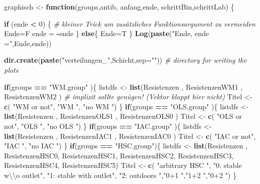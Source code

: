 \documentclass[
]{article}
\newenvironment{Shaded}{\begin{snugshade}}{\end{snugshade}}
\newcommand{\CharTok}[1]{\textcolor[rgb]{0.31,0.60,0.02}{#1}}
\newcommand{\CommentTok}[1]{\textcolor[rgb]{0.56,0.35,0.01}{\textit{#1}}}
\newcommand{\ControlFlowTok}[1]{\textcolor[rgb]{0.13,0.29,0.53}{\textbf{#1}}}
\newcommand{\DataTypeTok}[1]{\textcolor[rgb]{0.13,0.29,0.53}{#1}}
\newcommand{\DecValTok}[1]{\textcolor[rgb]{0.00,0.00,0.81}{#1}}
\newcommand{\KeywordTok}[1]{\textcolor[rgb]{0.13,0.29,0.53}{\textbf{#1}}}
\newcommand{\NormalTok}[1]{#1}
\newcommand{\OperatorTok}[1]{\textcolor[rgb]{0.81,0.36,0.00}{\textbf{#1}}}
\newcommand{\StringTok}[1]{\textcolor[rgb]{0.31,0.60,0.02}{#1}}
\begin{document}
\begin{Shaded}
\begin{Highlighting}[]
\NormalTok{graphisch <-}\StringTok{ }\ControlFlowTok{function}\NormalTok{(groups,antib, anfang,ende, schrittBin,schrittLab) \{    }

  \ControlFlowTok{if}\NormalTok{ (ende }\OperatorTok{<}\StringTok{ }\DecValTok{0}\NormalTok{) \{            }\CommentTok{# kleiner Trick um zusätzliches Funktionsargument zu vermeiden}
\NormalTok{    Ende=F}
\NormalTok{    ende =}\StringTok{ }\OperatorTok{-}\NormalTok{ende}
\NormalTok{  \} }\ControlFlowTok{else}\NormalTok{\{}
\NormalTok{    Ende=T}
\NormalTok{  \}}
  \KeywordTok{Log}\NormalTok{(}\KeywordTok{paste}\NormalTok{(}\StringTok{"Ende, ende ="}\NormalTok{,Ende,ende))}
  
  \KeywordTok{dir.create}\NormalTok{(}\KeywordTok{paste}\NormalTok{(}\StringTok{"verteilungen_"}\NormalTok{,Schicht,}\DataTypeTok{sep=}\StringTok{""}\NormalTok{))             }\CommentTok{# directory for writing the plots}
  
  \ControlFlowTok{if}\NormalTok{(groups }\OperatorTok{==}\StringTok{ "WM.group"}\NormalTok{ )\{}
\NormalTok{    listdfs <-}\StringTok{ }\KeywordTok{list}\NormalTok{(Resistenzen    , ResistenzenWM1 , ResistenzenWM2 )  }\CommentTok{#  implizit sollte genügen! (Vektor klappt hier nicht)}
\NormalTok{    Titel   <-}\StringTok{ }\KeywordTok{c}\NormalTok{(   }\StringTok{"WM or not"}\NormalTok{, }\StringTok{"WM           "}\NormalTok{, }\StringTok{"no WM     "}\NormalTok{)}
\NormalTok{  \}}
   \ControlFlowTok{if}\NormalTok{(groups }\OperatorTok{==}\StringTok{ "OLS.group"}\NormalTok{ )\{}
\NormalTok{    listdfs <-}\StringTok{ }\KeywordTok{list}\NormalTok{(Resistenzen    , ResistenzenOLS1 , ResistenzenOLS0 )  }
\NormalTok{    Titel   <-}\StringTok{ }\KeywordTok{c}\NormalTok{(   }\StringTok{"OLS or not"}\NormalTok{, }\StringTok{"OLS           "}\NormalTok{, }\StringTok{"no OLS      "}\NormalTok{)}
\NormalTok{  \}}
   \ControlFlowTok{if}\NormalTok{(groups }\OperatorTok{==}\StringTok{ "IAC.group"}\NormalTok{ )\{}
\NormalTok{    listdfs <-}\StringTok{ }\KeywordTok{list}\NormalTok{(Resistenzen    , ResistenzenIAC1 , ResistenzenIAC0 ) }
\NormalTok{    Titel   <-}\StringTok{ }\KeywordTok{c}\NormalTok{(   }\StringTok{"IAC or not"}\NormalTok{, }\StringTok{"IAC           "}\NormalTok{, }\StringTok{"no IAC      "}\NormalTok{)}
\NormalTok{  \}}
  \ControlFlowTok{if}\NormalTok{(groups }\OperatorTok{==}\StringTok{ "HSC.group"}\NormalTok{)\{}
\NormalTok{    listdfs <-}\StringTok{ }\KeywordTok{list}\NormalTok{(Resistenzen    , ResistenzenHSC0, ResistenzenHSC1, }
\NormalTok{                    ResistenzenHSC2, ResistenzenHSC3, ResistenzenHSC4, ResistenzenHSC5)  }
\NormalTok{    Titel   <-}\StringTok{ }\KeywordTok{c}\NormalTok{(   }\StringTok{"arbitrary HSC          "}\NormalTok{, }
                    \StringTok{"0: stable w}\CharTok{\textbackslash{}\textbackslash{}}\StringTok{o  outlet"}\NormalTok{, }\StringTok{"1: stable with outlet"}\NormalTok{, }\StringTok{"2: outdoors          "}\NormalTok{,}\StringTok{"0+1                  "}\NormalTok{,}\StringTok{"1+2                  "}\NormalTok{,}\StringTok{"0+2                  "}\NormalTok{)}
\NormalTok{  \}}
  

\end{Highlighting}
\end{Shaded}
\end{document}
